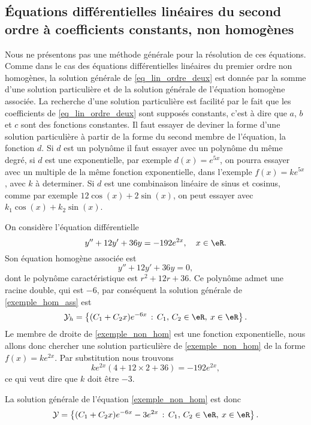 \subsection{Équations différentielles linéaires du second ordre à coefficients constants, non homogènes}

Nous ne présentons pas une méthode générale pour la résolution de ces équations. Comme dans le cas des équations différentielles linéaires du premier ordre non homogènes, la solution générale de \eqref{eq_lin_ordre_deux} est donnée par la somme d'une solution particulière et de la solution générale de l'équation homogène associée. La recherche d'une solution particulière est facilité par le fait que les coefficients de \eqref{eq_lin_ordre_deux} sont supposés constants, c'est à dire que $a$, $b$ et $c$ sont des fonctions constantes. Il faut essayer de deviner la forme d'une solution particulière à partir de la forme du second membre de l'équation, la fonction $d$. Si $d$ est un polynôme il faut essayer avec un polynôme du même degré, si $d$ est une exponentielle, par exemple $d(x) = e^{5x}$, on pourra essayer avec un multiple de la m\^eme fonction exponentielle, dans l'exemple $f(x) = k e^{5x}$, avec $k$ à determiner. Si $d$ est une combinaison linéaire de sinus et cosinus, comme par exemple $12\cos(x) + 2\sin(x)$, on peut essayer avec $k_1\cos(x) + k_2\sin(x)$. 

\begin{example}
  On considère l'équation différentielle 
  \begin{equation}\label{exemple_non_hom}
    y'' + 12y' + 36 y = -192 e^{2x}, \quad x\in\eR.
  \end{equation}
  Son équation homogène associée est 
\begin{equation}\label{exemple_hom_ass}
    y'' + 12y' + 36 y = 0,
  \end{equation}
dont le polynôme caractéristique est $r^2 + 12 r + 36$. Ce polynôme admet une racine double, qui est $-6$, par conséquent la solution générale de \eqref{exemple_hom_ass} est 
\begin{equation*}
      \mathcal{Y}_h  = \left\{(C_1  +C_2x) e^{-6 x} \,:\, C_1,\, C_2 \in \eR, \: x\in \eR\right\}.
    \end{equation*} 
Le membre de droite de \eqref{exemple_non_hom} est une fonction exponentielle, nous allons donc chercher une solution particulière de \eqref{exemple_non_hom} de la forme $f(x) = ke^{2x}$. Par substitution nous trouvons
\[
  ke^{2x}(4 + 12 \times 2 +36) = -192 e^{2x},   
\]
ce qui veut dire que $k$ doit \^etre $-3$. 

La solution générale de l'équation \eqref{exemple_non_hom} est donc 
\begin{equation*}
      \mathcal{Y}  = \left\{(C_1  +C_2x) e^{-6 x} -3e^{2x} \,:\, C_1,\, C_2 \in \eR, \: x\in \eR\right\}.
    \end{equation*} 
\end{example}

